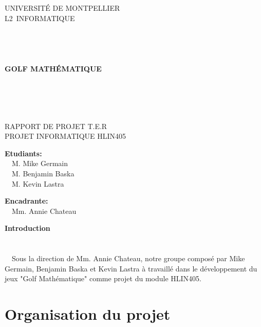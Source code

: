 \documentclass{article}
\begin{document}
\begin{center}
\linespread{2.0}\selectfont

{\Huge U}{\huge NIVERSITÉ DE }{\Huge M}{\huge ONTPELLIER}\\
{\huge L2}{\LARGE ~INFORMATIQUE }
\\~\\~\\~\\~\\
{\Large\textbf{GOLF MATHÉMATIQUE}}
\\~\\~\\~\\~\\

\linespread{1}\selectfont

RAPPORT DE PROJET T.E.R\\
PROJET INFORMATIQUE HLIN405\\
\vfill
\end{center}
\begin{multicols}{2}
\begin{flushleft}
\textbf{Etudiants:}\\
~~M. Mike Germain\\
~~M. Benjamin Baska\\
~~M. Kevin Lastra
\end{flushleft}
\columnbreak
\begin{flushright}
\textbf{Encadrante:}\\
~~Mm. Annie Chateau
\end{flushright}
\end{multicols}
\newpage
\setcounter{page}{1}
\tableofcontents
\newpage
{\textbf{\Huge Introduction}}\\~\\~\\
~~Sous la direction de Mm. Annie Chateau, notre groupe composé par Mike Germain, Benjamin Baska et Kevin Lastra à travaillé dans le développement du jeux "Golf Mathématique" comme projet du module HLIN405.

\newpage
\section{Organisation du projet}
\end{document}
